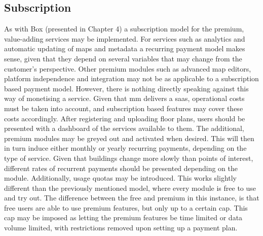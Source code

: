 \begin{table}[]
\centering
\caption{Proposed modularisation of MazeMap}
\label{modules}
\end{table}

\subsection{Subscription}
As with Box (presented in Chapter 4) a subscription model for the premium, value-adding services may be implemented. For services such as analytics and automatic updating of maps and metadata a recurring payment model makes sense, given that they depend on several variables that may change from the customer's perspective. Other premium modules such as advanced map editors, platform independence and integration may not be as applicable to a subscription based payment model. However, there is nothing directly speaking against this way of monetising a service. Given that \gls{mm} delivers a \gls{saas}, operational costs must be taken into account, and subscription based features may cover these costs accordingly. After registering and uploading floor plans, users should be presented with a dashboard of the services available to them. The additional, premium modules may be greyed out and activated when desired. This will then in turn induce either monthly or yearly recurring payments, depending on the type of service. Given that buildings change more slowly than points of interest, different rates of recurrent payments should be presented depending on the module. Additionally, usage quotas may be introduced. This works slightly different than the previously mentioned model, where every module is free to use and try out. The difference between the free and premium in this instance, is that free users are able to use premium features, but only up to a certain cap. This cap may be imposed as letting the premium features be time limited or data volume limited, with restrictions removed upon setting up a payment plan.  

